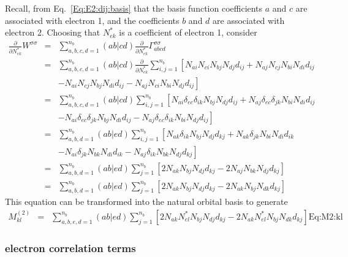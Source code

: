 \documentclass[pra,nofootinbib]{revtex4-1}
\newcommand{\dlabel}[1]{\text{#1}\label{#1}}
\begin{document}
Recall, from Eq.~\ref{Eq:E2:dij:basis} that the basis function coefficients
$a$ and $c$ are associated with electron 1, and the coefficients $b$ and $d$
are associated with electron 2. Choosing that $N_{ek}^*$ is a coefficient of
electron 1,
consider
\begin{eqnarray}
   \frac{\partial}{\partial N^*_{ek}}W^{\sigma\sigma}
   &=& \sum_{a,b,c,d=1}^{n_b}(ab|cd)\frac{\partial}{\partial N^*_{ek}}
       \Gamma_{abcd}^{\sigma\sigma} \\
   &=& \sum_{a,b,c,d=1}^{n_b}(ab|cd)\frac{\partial}{\partial N^*_{ek}}
       \sum_{i,j=1}^{n_b}\left[
       N_{ai}N_{ci}N_{bj}N_{dj} d_{ij}
      +N_{aj}N_{cj}N_{bi}N_{di} d_{ij}\right. \nonumber \\
   && \left.-N_{ai}N_{cj}N_{bj}N_{di} d_{ij}
      -N_{aj}N_{ci}N_{bi}N_{dj} d_{ij}\right] \\
   &=& \sum_{a,b,c,d=1}^{n_b}(ab|cd)
       \sum_{i,j=1}^{n_b}\left[
       N_{ai}\delta_{ec}\delta_{ik}N_{bj}N_{dj} d_{ij}
      +N_{aj}\delta_{ec}\delta_{jk}N_{bi}N_{di} d_{ij}\right. \nonumber \\
   && \left.-N_{ai}\delta_{ec}\delta_{jk}N_{bj}N_{di} d_{ij}
      -N_{aj}\delta_{ec}\delta_{ik}N_{bi}N_{dj} d_{ij}\right] \\
   &=& \sum_{a,b,d=1}^{n_b}(ab|ed)
       \sum_{i,j=1}^{n_b}\left[
       N_{ak}\delta_{ik}N_{bj}N_{dj} d_{kj}
      +N_{ak}\delta_{jk}N_{bi}N_{di} d_{ik}\right. \nonumber \\
   && \left.-N_{ai}\delta_{jk}N_{bk}N_{di} d_{ik}
      -N_{aj}\delta_{ik}N_{bk}N_{dj} d_{kj}\right] \\
   &=& \sum_{a,b,d=1}^{n_b}(ab|ed)
       \sum_{j=1}^{n_b}\left[
       2 N_{ak}N_{bj}N_{dj} d_{kj}
      -2 N_{aj}N_{bk}N_{dj} d_{kj}\right] \\
   &=& \sum_{a,b,d=1}^{n_b}(ab|ed)
       \sum_{j=1}^{n_b}\left[
       2 N_{ak}N_{bj}N_{dj} d_{kj}
      -2 N_{ak}N_{bj}N_{dk} d_{kj}\right]
\end{eqnarray}
This equation can be transformed into the natural orbital basis to generate
\begin{eqnarray}
   M^{(2)}_{kl}
   &=& \sum_{a,b,e,d=1}^{n_b}(ab|ed)
       \sum_{j=1}^{n_b}\left[
       2 N_{ak}N^*_{el}N_{bj}N_{dj} d_{kj}
      -2 N_{ak}N^*_{el}N_{bj}N_{dk} d_{kj}\right]
       \dlabel{Eq:M2:kl}
\end{eqnarray}

\subsubsection{electron correlation terms}
\end{document}

